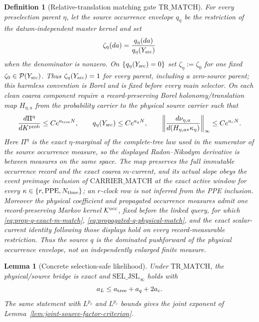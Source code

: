 \documentclass[11pt]{article}
\newtheorem{lemma}[theorem]{Lemma}
\newtheorem{definition}[theorem]{Definition}
\begin{document}
\begin{definition}[Relative-translation matching gate
$\mathrm{TR\_MATCH}$]
\label{def:translation-match}
For every preselection parent $\eta$, let the source occurrence envelope
$q_\eta$ be the restriction of the datum-independent master kernel and set
\begin{equation}
\label{eq:translation-proposal}
 \zeta_\eta(da)=\frac{q_\eta(da)}{q_\eta(Y_{\rm src})}
\end{equation}
when the denominator is nonzero.  On
$\{q_\eta(Y_{\rm src})=0\}$ set $\zeta_\eta:=\zeta_0$ for one fixed
$\zeta_0\in\mathcal P(Y_{\rm src})$.  Thus
$\zeta_\eta(Y_{\rm src})=1$ for every parent, including a zero-source
parent; this harmless convention is Borel and is fixed before every main
selector.  On each clean coarea component require a record-preserving Borel
holonomy/translation map $H_{\eta,a}$ from the probability carrier to the
physical source carrier such that
\begin{equation}
\label{eq:translation-match-bounds}
 \frac{d\Pi^{\eta}}{dK^{\rm prob}}\le Ce^{a_{\rm tree}N},\qquad
 q_\eta(Y_{\rm src})\le Ce^{a_qN},\qquad
 \left\|\frac{d\nu_{\eta,a}}
 {d(H_{\eta,a*}\kappa_\eta)}\right\|_\infty
 \le Ce^{a_cN}.
\end{equation}
Here $\Pi^{\eta}$ is the exact $\eta$-marginal of the complete-tree law
used in the numerator of the source occurrence measure, so the displayed
Radon--Nikodym derivative is between measures on the same space.
The map preserves the full immutable occurrence record and the exact
coarea $m$-current, and its actual slope obeys the event preimage inclusion
of $\mathrm{CARRIER\_MATCH}$ at the exact active window for every
$\kappa\in\{r,\mathrm{PPE},N_{\rm time}\}$; an $r$-clock row is not inferred
from the PPE inclusion.  Moreover the physical coefficient and propagated
occurrence measures admit one record-preserving Markov kernel
$\mathcal K^{\rm occ}$, fixed before the linked query, for which
\eqref{eq:prop-q-exact-m-match},
\eqref{eq:propagated-q-physical-match}, and the exact scalar-current
identity following those displays hold on every record-measurable
restriction.  Thus the source $q$ is the dominated pushforward of the
physical occurrence envelope, not an independently enlarged finite
measure.
\end{definition}

\begin{lemma}[Concrete selection-safe likelihood]
\label{lem:translation-match-implies-jsl}
Under $\mathrm{TR\_MATCH}$, the physical/source bridge is exact and
$\mathrm{SEL\_JSL}_\infty$ holds with
\begin{equation}
\label{eq:translation-likelihood-loss}
 a_L\le a_{\rm tree}+a_q+2a_c.
\end{equation}
The same statement with $L^{p_o}$ and $L^{p_c}$ bounds gives the joint
exponent of Lemma~\ref{lem:joint-source-factor-criterion}.
\end{lemma}
\end{document}
